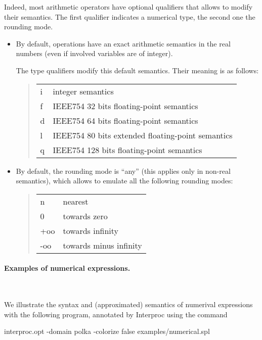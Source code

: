 \documentclass[a4paper,11pt]{article}
\begin{document}
Indeed, most arithmetic operators have optional qualifiers that
allows to modify their semantics. The first qualifier indicates a
numerical type, the second one the rounding mode.
\begin{itemize}
\item By default, operations have an exact arithmetic semantics in
  the real numbers (even if involved variables are of integer).

  The type qualifiers modify this default semantics.
  Their meaning is as follows:
  \begin{quote}
    \begin{tabular}{ll}
      i & integer semantics \\
      f & IEEE754 32 bits floating-point semantics \\
      d & IEEE754 64 bits floating-point semantics \\
      l & IEEE754 80 bits extended floating-point semantics \\
      q & IEEE754 128 bits floating-point semantics \\
    \end{tabular}
  \end{quote}

\item By default, the rounding mode is ``any'' (this applies only
  in non-real semantics), which allows to emulate all the
  following rounding modes:
  \begin{quote}
    \begin{tabular}{ll}
      n & nearest \\
      0 & towards zero \\
      +oo & towards infinity \\
      -oo & towards minus infinity
    \end{tabular}
  \end{quote}
\end{itemize}

\paragraph{Examples of numerical expressions.}\T~

We illustrate the syntax and (approximated) semantics of numerival
expressions with the following program, annotated by Interproc
using the command
\begin{example}
  interproc.opt -domain polka -colorize false examples/numerical.spl  
\end{example}
\end{document}
